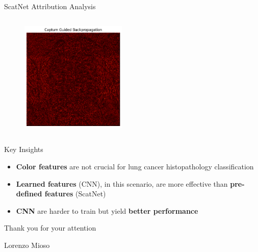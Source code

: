 \documentclass[aspectratio=169,8pt]{beamer}  %
\begin{document}
\begin{frame}{ScatNet Attribution Analysis}
\begin{columns}[T]
\begin{column}{0.5\textwidth}
\begin{figure}
\vspace{0.2cm}
\includegraphics[width=0.45\textwidth]{imgs/scatnet_gbp_captum.png}
\end{figure}
\end{column}
\end{columns}
\end{frame}


\begin{frame}{Key Insights}
\begin{itemize}
\item \textbf{Color features} are not crucial for lung cancer histopathology classification
\item \textbf{Learned features} (CNN), in this scenario, are more effective than \textbf{pre-defined features} (ScatNet)
\item \textbf{CNN} are harder to train but yield \textbf{better performance}
\end{itemize}
\end{frame}

\begin{frame}[plain]
\centering
\vspace{2cm}
{\Large Thank you for your attention}

\vspace{1cm}
{\large Lorenzo Mioso}
\end{frame}
\end{document}
